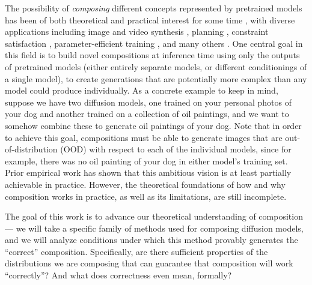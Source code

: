 The possibility of \emph{composing} different concepts represented by pretrained models has been of both theoretical and practical interest for some time \citep{jacobs1991adaptive, hinton2002training, du2024compositional}, with diverse applications including image and video synthesis \cite{du2023reduce, du2020visualenergy, liu2022compositional, liu2021learning, nie2021controllable, yang2023probabilistic, wang2024concept}, planning \cite{ajay2024compositional, janner2022planning}, constraint satisfaction \citep{yang2023compositional}, parameter-efficient training \citep{hu2021lora, ilharco2022editing}, and many others \citep{wu2024compositional, su2024decomposition, urain2023composable, anonymous2024scaling}.
One central goal in this field is to build novel compositions at inference time using only the outputs of pretrained models (either entirely separate models, or different conditionings of a single model), to create generations that are potentially more complex than any model could produce individually.
As a concrete example to keep in mind, suppose we have two diffusion models,
one trained on your personal photos of your dog and another trained on a collection of oil paintings,
and we want to somehow combine these to generate oil paintings of your dog.
Note that in order to achieve this goal,
compositions must be able to generate images that are out-of-distribution (OOD) with respect to each of the individual models, since for example,
there was no oil painting of your dog in either model's training set.
Prior empirical work has shown that this ambitious vision is at least partially achievable in practice.
However, the theoretical foundations of how and why composition works in practice, as well as its limitations, are still incomplete.



The goal of this work is to advance our theoretical understanding of composition---
we will take a specific family of methods used for composing diffusion models,
and we will analyze conditions under which this method 
provably generates the ``correct'' composition.
Specifically, are there sufficient properties of the distributions we are composing that can guarantee that composition will work ``correctly''?
And what does correctness even mean, formally?



